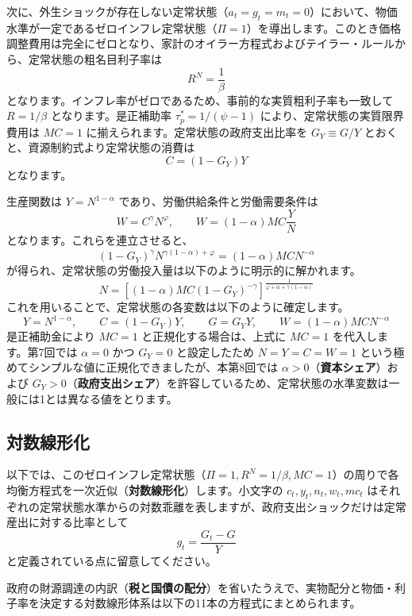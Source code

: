 \documentclass[
  japanese,
  lualatex,
  ja=standard,
  12pt,
  a4paper]{ltjsarticle}
\begin{document}
次に、外生ショックが存在しない定常状態（\(a_t=g_t=m_t=0\)）において、物価水準が一定であるゼロインフレ定常状態（\(\Pi=1\)）を導出します。このとき価格調整費用は完全にゼロとなり、家計のオイラー方程式およびテイラー・ルールから、定常状態の粗名目利子率は
\[
R^N=\frac{1}{\beta}
\]
となります。インフレ率がゼロであるため、事前的な実質粗利子率も一致して
\(R=1/\beta\) となります。是正補助率 \(\tau_p^*=1/(\psi-1)\)
により、定常状態の実質限界費用は \(MC=1\)
に揃えられます。定常状態の政府支出比率を \(G_Y \equiv G/Y\)
とおくと、資源制約式より定常状態の消費は \[
C=(1-G_Y)Y
\] となります。

\Needspace{0.30\textheight}

生産関数は \(Y=N^{1-\alpha}\) であり、労働供給条件と労働需要条件は \[
W=C^\gamma N^\varphi,
\qquad
W=(1-\alpha)MC\frac{Y}{N}
\] となります。これらを連立させると、 \[
(1-G_Y)^\gamma N^{\gamma(1-\alpha)+\varphi}
=
(1-\alpha)MC N^{-\alpha}
\] が得られ、定常状態の労働投入量は以下のように明示的に解かれます。 \[
N
=
\left[
(1-\alpha)MC(1-G_Y)^{-\gamma}
\right]^{
\frac{1}{\varphi+\alpha+\gamma(1-\alpha)}
}
\] これを用いることで、定常状態の各変数は以下のように確定します。 \[
Y=N^{1-\alpha},
\qquad
C=(1-G_Y)Y,
\qquad
G=G_YY,
\qquad
W=(1-\alpha)MCN^{-\alpha}
\] 是正補助金により \(MC=1\) と正規化する場合は、上式に \(MC=1\)
を代入します。第7回では \(\alpha=0\) かつ \(G_Y=0\) と設定したため
\(N=Y=C=W=1\) という極めてシンプルな値に正規化できましたが、本第8回では
\(\alpha>0\)（\textbf{資本シェア}）および
\(G_Y>0\)（\textbf{政府支出シェア}）を許容しているため、定常状態の水準変数は一般には1とは異なる値をとります。

\Needspace{0.50\textheight}

\subsection{対数線形化}\label{ux5bfeux6570ux7ddaux5f62ux5316}

以下では、このゼロインフレ定常状態（\(\Pi=1, R^N=1/\beta, MC=1\)）の周りで各均衡方程式を一次近似（\textbf{対数線形化}）します。小文字の
\(c_t, y_t, n_t, w_t, mc_t\)
はそれぞれの定常状態水準からの対数乖離を表しますが、政府支出ショックだけは定常産出に対する比率として
\[
g_t=\frac{G_t-G}{Y}
\] と定義されている点に留意してください。

政府の財源調達の内訳（\textbf{税と国債の配分}）を省いたうえで、実物配分と物価・利子率を決定する対数線形体系は以下の11本の方程式にまとめられます。

\Needspace{0.56\textheight}
\end{document}

